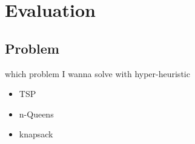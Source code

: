 \chapter{Evaluation}

\section{Problem}
which problem I wanna solve with hyper-heuristic

\begin{itemize}
	\item TSP
	\item n-Queens
	\item knapsack
\end{itemize}

